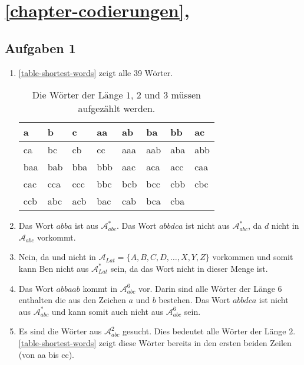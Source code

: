 \section{\autoref{chapter-codierungen}, }

\subsection*{Aufgaben 1}

\begin{enumerate}
\item \autoref{table-shortest-words} zeigt alle 39 Wörter.

\begin{table}[htb]
\centering
\begin{tabular}{|l|l|l|l|l|l|l|l|}
\hline
a   & b   & c   & aa  & ab  & ba  & bb  & ac  \\ \hline
ca  & bc  & cb  & cc  & aaa & aab & aba & abb \\ \hline
baa & bab & bba & bbb & aac & aca & acc & caa \\ \hline
cac & cca & ccc & bbc & bcb & bcc & cbb & cbc \\ \hline
ccb & abc & acb & bac & cab & bca & cba &     \\ \hline
\end{tabular}
\caption{Die Wörter der Länge $1$, $2$ und $3$ müssen aufgezählt werden.}
\label{table-shortest-words}
\end{table}

\item Das Wort $abba$ ist aus $\mathscr{A}_{abc}^*$. Das Wort $abbdca$ ist nicht aus $\mathscr{A}_{abc}^*$, da $d$ nicht in $\mathscr{A}_{abc}$ vorkommt.
\item Nein, da  und  nicht in $\mathscr{A}_{Lat} = \{A, B, C, D, \dots , X, Y, Z\}$ vorkommen und somit kann Ben nicht aus $\mathscr{A}_{Lat}^*$ sein, da das Wort nicht in dieser Menge ist.
\item Das Wort $abbaab$ kommt in $\mathscr{A}_{abc}^6$ vor. Darin sind alle Wörter der Länge 6 enthalten die aus den Zeichen $a$ und $b$ bestehen. Das Wort $abbdca$ ist nicht aus $\mathscr{A}_{abc}^*$ und kann somit auch nicht aus $\mathscr{A}_{abc}^6$ sein.
\item Es sind die Wörter aus $\mathscr{A}_{abc}^2$ gesucht. Dies bedeutet alle Wörter der Länge $2$. \autoref{table-shortest-words} zeigt diese Wörter bereits in den ersten beiden Zeilen (von aa bis cc).
\end{enumerate}

